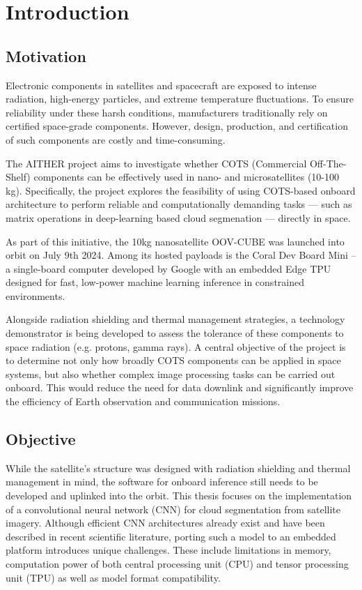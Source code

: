 {

\setlength{\parindent}{0pt}
\setlength{\parskip}{1em}

\section{Introduction}
\subsection{Motivation}

Electronic components in satellites and spacecraft are exposed to intense radiation, high-energy particles, and extreme temperature fluctuations. To ensure reliability under these harsh conditions, manufacturers traditionally rely on certified space-grade components. However, design, production, and certification of such components are costly and time\--con\-su\-ming. 

The AITHER project aims to investigate whether COTS (Commercial Off-The-Shelf) components can be effectively used in nano- and microsatellites (10-100 kg). Specifically, the project explores the feasibility of using COTS-based onboard architecture to perform reliable and computationally demanding tasks --- such as matrix operations in deep-learning based cloud segmenation --- directly in space. 

As part of this initiative, the 10kg nanosatellite OOV-CUBE was launched into orbit on July 9th 2024. Among its hosted payloads is the Coral Dev Board Mini – a single-board computer developed by Google with an embedded Edge TPU designed for fast, low-power machine learning inference in constrained environments.

Alongside radiation shielding and thermal management strategies, a technology demonstrator is being developed to assess the tolerance of these components to space radiation (e.g. protons, gamma rays). A central objective of the project is to determine not only how broadly COTS components can be applied in space systems, but also whether complex image processing tasks can be carried out onboard. This would reduce the need for data downlink and significantly improve the efficiency of Earth observation and communication missions.

\subsection{Objective}

While the satellite's structure was designed with radiation shielding and thermal management in mind, the software for onboard inference still needs to be developed and uplinked into the orbit. This thesis focuses on the implementation of a convolutional neural network (CNN) for cloud segmentation from satellite imagery. Although efficient CNN architectures already exist and have been described in recent scientific literature, porting such a model to an embedded platform introduces unique challenges. These include limitations in memory, computation power of both central processing unit (CPU) and tensor processing unit (TPU) as well as model format compatibility.

}
